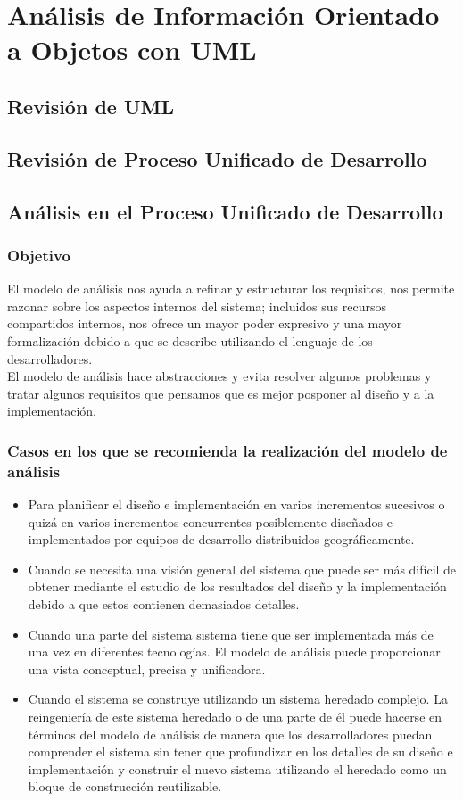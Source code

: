 \section{Análisis de Información Orientado a Objetos con UML}

\subsection{Revisión de UML}
\subsection{Revisión de Proceso Unificado de Desarrollo}
\subsection{Análisis en el Proceso Unificado de Desarrollo}
\subsubsection{Objetivo}
El modelo de análisis nos ayuda a refinar y estructurar los requisitos, nos permite razonar sobre los aspectos internos del sistema; incluidos sus recursos compartidos internos, nos ofrece un mayor poder expresivo y una mayor formalización debido a que se describe utilizando el lenguaje de los desarrolladores.\\

El modelo de análisis hace abstracciones y evita resolver algunos problemas y tratar algunos requisitos que pensamos que es mejor posponer al diseño y a la implementación.

\subsubsection{Casos en los que se recomienda la realización del modelo de análisis}
\begin{itemize}
	\item Para planificar el diseño e implementación en varios incrementos sucesivos o quizá en varios incrementos concurrentes posiblemente diseñados e implementados por equipos de desarrollo distribuidos geográficamente.
	\item Cuando se necesita una visión general del sistema que puede ser más difícil de obtener mediante el estudio de los resultados del diseño y la implementación debido a que estos contienen demasiados detalles.
	\item Cuando una parte del sistema sistema tiene que ser implementada más de una vez en diferentes tecnologías. El modelo de análisis puede proporcionar una vista conceptual, precisa y unificadora.
	\item Cuando el sistema se construye utilizando un sistema heredado complejo. La reingeniería de este sistema heredado o de una parte de él puede hacerse en términos del modelo de análisis de manera que los desarrolladores puedan comprender el sistema sin tener que profundizar en los detalles de su diseño e implementación y construir el nuevo sistema utilizando el heredado como un bloque de construcción reutilizable.
\end{itemize}
